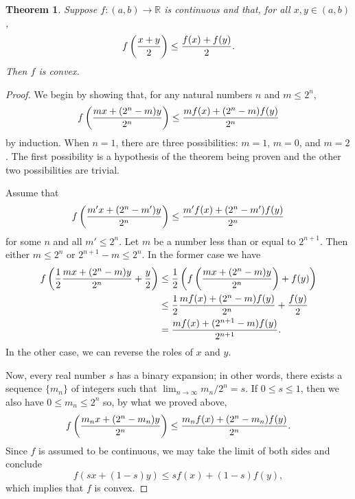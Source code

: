 \documentclass[12pt]{article}
\newtheorem{thm}{Theorem}
\begin{document}
\begin{thm}
Suppose $f \colon (a,b) \to \mathbb{R}$ is continuous and that,
for all $x,y \in (a,b)$,
\[
f \left( {x + y \over 2} \right) \le {f(x) + f(y) \over 2} .
\]
Then $f$ is convex.
\end{thm}

\begin{proof}
We begin by showing that, for any natural numbers $n$ and $m \le 2^n$,
\[
f \left( {m x + (2^n - m) y \over 2^n} \right) \le 
{m f(x) + (2^n - m) f(y) \over 2^n} 
\]
by induction.  When $n=1$, there are three possibilities: $m=1$, $m=0$,
and $m=2$.  The first possibility is a hypothesis of the theorem being
proven and the other two possibilities are trivial.

Assume that
\[
f \left( {m' x + (2^n - m') y \over 2^n} \right) \le 
{m' f(x) + (2^n - m') f(y) \over 2^n} 
\]
for some $n$ and all $m' \le 2^n$.  Let $m$ be a number less than or equal
to $2^{n+1}$.  Then either $m \le 2^n$ or $2^{n+1} - m \le 2^n$.  In the
former case we have
\begin{align*}
f \left( {1 \over 2} {m x + (2^n - m) y \over 2^n} + 
{y \over 2} \right) &\le 
{1 \over 2} \left( f \left( {m x + (2^n - m) y \over 2^n} \right) +
f(y) \right) \\ &\le
{1 \over 2} {m f(x) + (2^n - m) f(y) \over 2^n} +
{f(y) \over 2} \\ &=
{m f(x) + (2^{n+1} - m) f(y) \over 2^{n+1}} .
\end{align*}
In the other case, we can reverse the roles of $x$ and $y$.

Now, every real number $s$ has a binary expansion; in other words, there
exists a sequence $\{m_n\}$ of integers such that $\lim_{n \to \infty} 
m_n / 2^n = s$.  If $0 \le s \le 1$, then we also have $0 \le m_n \le 2^n$
so, by what we proved above,
\[
f \left( {m_n x + (2^n - m_n) y \over 2^n} \right) \le 
{m_n f(x) + (2^n - m_n) f(y) \over 2^n} .
\]
Since $f$ is assumed to be continuous, we may take the limit of both
sides and conclude
\[
f( s x + (1 - s) y ) \le s f (x) + (1 - s) f (y) ,
\]
which implies that $f$ is convex.
\end{proof}
\end{document}
